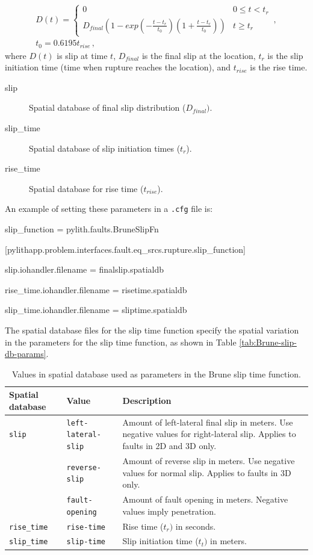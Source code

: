 \begin{gather}
D(t)=\left\{ \begin{array}{cc}
0 & 0\leq t<t_{r}\\
D_{final}\left(1-exp\left(-\frac{t-t_{r}}{t_{0}}\right)\left(1+\frac{t-t_{r}}{t_{0}}\right)\right) & t\ge t_{r}
\end{array}\right.\,,\\
t_{0}=0.6195t_{\mathit{rise}}\,,
\end{gather}
where $D(t)$ is slip at time $t$, $D_{final}$ is the final slip
at the location, $t_{r}$ is the slip initiation time (time when rupture
reaches the location), and $t_{\mathit{rise}}$ is the rise time.
\begin{description}
\item [{slip}] Spatial database of final slip distribution ($D_{final})$.
\item [{slip\_time}] Spatial database of slip initiation times ($t_{r}$).
\item [{rise\_time}] Spatial database for rise time ($t_{\mathit{rise}}$).
\end{description}
An example of setting these parameters in a \texttt{.cfg} file is:
\begin{lyxcode}

slip\_function = pylith.faults.BruneSlipFn

[pylithapp.problem.interfaces.fault.eq\_srcs.rupture.slip\_function]

slip.iohandler.filename = finalslip.spatialdb

rise\_time.iohandler.filename = risetime.spatialdb

slip\_time.iohandler.filename = sliptime.spatialdb
\end{lyxcode}
The spatial database files for the slip time function specify the
spatial variation in the parameters for the slip time function, as
shown in Table \vref{tab:Brune-slip-db-params}.

\begin{table}[htbp]
\caption{Values in spatial database used as parameters in the Brune slip time function.}
\label{tab:Brune-slip-db-params}
\begin{tabular}{llp{2.5in}|}
\textbf{Spatial database} & \textbf{Value} & \textbf{Description}\\
\hline 
\texttt{slip} & \texttt{left-lateral-slip} & Amount of left-lateral final slip in meters. Use negative values for
right-lateral slip. Applies to faults in 2D and 3D only.\\
 & \texttt{reverse-slip} & Amount of reverse slip in meters. Use negative values for normal slip.
Applies to faults in 3D only.\\
 & \texttt{fault-opening} & Amount of fault opening in meters. Negative values imply penetration.\\
\hline 
\texttt{rise\_time} & \texttt{rise-time} & Rise time ($t_{r})$ in seconds.\\
\hline 
\texttt{slip\_time} & \texttt{slip-time} & Slip initiation time ($t_{t})$ in meters.\\
\hline 
\end{tabular}
\end{table}


